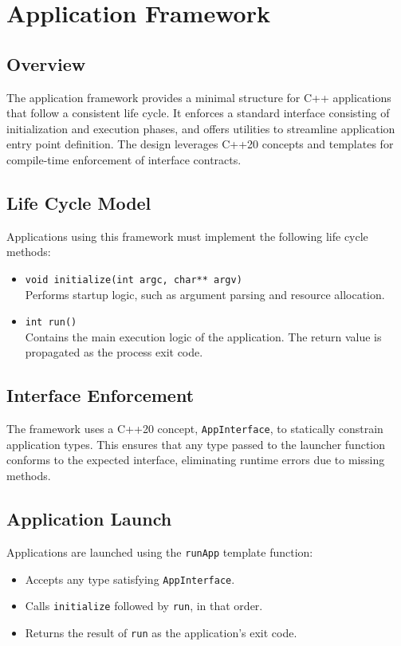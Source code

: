 \section{Application Framework}
\label{sec:app-framework}

\subsection*{Overview}
The application framework provides a minimal structure for C++ applications that follow a consistent life cycle. It enforces a standard interface consisting of initialization and execution phases, and offers utilities to streamline application entry point definition. The design leverages C++20 concepts and templates for compile-time enforcement of interface contracts.

\subsection*{Life Cycle Model}
Applications using this framework must implement the following life cycle methods:
\begin{itemize}
	\item \texttt{void initialize(int argc, char** argv)} \\
	Performs startup logic, such as argument parsing and resource allocation.
	\item \texttt{int run()} \\
	Contains the main execution logic of the application. The return value is propagated as the process exit code.
\end{itemize}

\subsection*{Interface Enforcement}
The framework uses a C++20 concept, \texttt{AppInterface}, to statically constrain application types. This ensures that any type passed to the launcher function conforms to the expected interface, eliminating runtime errors due to missing methods.

\subsection*{Application Launch}
Applications are launched using the \texttt{runApp} template function:
\begin{itemize}
	\item Accepts any type satisfying \texttt{AppInterface}.
	\item Calls \texttt{initialize} followed by \texttt{run}, in that order.
	\item Returns the result of \texttt{run} as the application's exit code.
\end{itemize}

